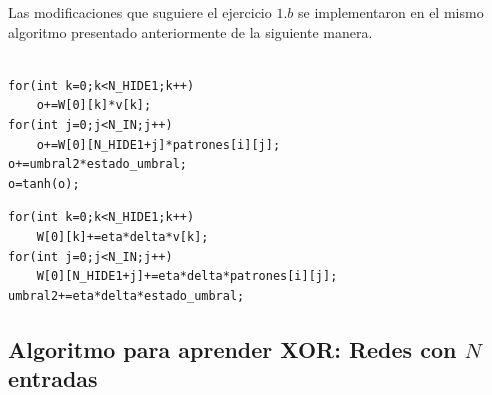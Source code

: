\documentclass[aps,prb,onecolumn,10pt,floatfix,superscriptaddress]{article} %
\begin{document}
Las modificaciones que suguiere el ejercicio $1.b$ se implementaron en el mismo algoritmo presentado anteriormente de la siguiente manera.

\begin{lstlisting}[frame=single,breaklines=true]

for(int k=0;k<N_HIDE1;k++)
	o+=W[0][k]*v[k];
for(int j=0;j<N_IN;j++)
	o+=W[0][N_HIDE1+j]*patrones[i][j];
o+=umbral2*estado_umbral;
o=tanh(o);
\end{lstlisting}

\begin{lstlisting}[frame=single,breaklines=true]
for(int k=0;k<N_HIDE1;k++)
	W[0][k]+=eta*delta*v[k];
for(int j=0;j<N_IN;j++)
	W[0][N_HIDE1+j]+=eta*delta*patrones[i][j];
umbral2+=eta*delta*estado_umbral;
\end{lstlisting}

\subsection{Algoritmo para aprender XOR: Redes con $N$ entradas}
\end{document}
